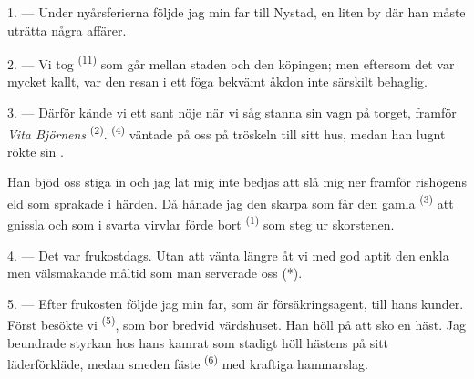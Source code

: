 

\VUsaut{4.0mm}
\VUsaut{3.0mm}
\VUfilet{16mm}
\VUsaut{5.6mm}
\VUsaut{3.0mm}

\VUsaut{3.0mm}

\VUsaut{4.0mm}

1. --- Under nyårsferierna följde jag min far till Nystad, en liten by där han måste uträtta
några affärer.

2. --- Vi tog  \textsuperscript{(11)} som går mellan staden och den
köpingen; men eftersom det var mycket kallt, var den resan i ett föga bekvämt åkdon inte
särskilt behaglig.

3. --- Därför kände vi ett sant nöje när vi såg  stanna sin vagn på torget,
framför \textit{Vita Björnens}  \textsuperscript{(2)}.
 \textsuperscript{(4)} väntade på oss på tröskeln till sitt hus, medan
han lugnt rökte sin .

Han bjöd oss stiga in och jag lät mig inte bedjas att slå mig ner framför rishögens eld som
sprakade i härden. Då hånade jag den skarpa
 som får den gamla  \textsuperscript{(3)}
att gnissla och som i svarta virvlar förde bort  \textsuperscript{(1)} som steg
ur skorstenen.

4. --- Det var frukostdags. Utan att vänta längre åt vi med god aptit den enkla men
välsmakande måltid som man serverade oss (*).

\VUsaut{3.0mm}

5. --- Efter frukosten följde jag min far, som är försäkringsagent, till hans kunder. Först
besökte vi  \textsuperscript{(5)}, som bor bredvid värdshuset. Han höll på att
sko en häst. Jag beundrade styrkan hos hans kamrat som stadigt höll hästens  på
sitt läderförkläde, medan smeden fäste
 \textsuperscript{(6)} med kraftiga hammarslag.

